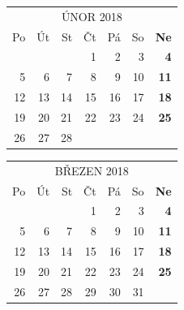 \documentclass{article}
\begin{document}
\selectfont
\def\arraystretch{1.75}
\tabcolsep=10pt
\begin{tabular}{*6{r}>{\bfseries}r}
\multicolumn{7}{c}{ÚNOR 2018}\\
\rowcolor[gray]{.75} Po & Út & St & Čt & Pá & So & Ne \\
\hline
                        &    &    & 1  & 2  & 3  & 4  \\
                     5  & 6  & 7  & 8  & 9  & 10 & 11 \\
                     12 & 13 & 14 & 15 & 16 & 17 & 18 \\
                     19 & 20 & 21 & 22 & 23 & 24 & 25 \\
                     26 & 27 & 28 &    &    &    &    \\
\end{tabular}

\newpage
\begin{table}[t!]
\centering
{}
\end{table}

\selectfont
\def\arraystretch{1.75}
\tabcolsep=10pt
\begin{tabular}{*6{r}>{\bfseries}r}
\multicolumn{7}{c}{BŘEZEN 2018}\\
\rowcolor[gray]{.75} Po & Út & St & Čt & Pá & So & Ne \\
\hline
                        &    &    & 1  & 2  & 3  & 4  \\
                     5  & 6  & 7  & 8  & 9  & 10 & 11 \\
                     12 & 13 & 14 & 15 & 16 & 17 & 18 \\
                     19 & 20 & 21 & 22 & 23 & 24 & 25 \\
                     26 & 27 & 28 & 29 & 30 & 31 &    \\
\end{tabular}
\end{document}
